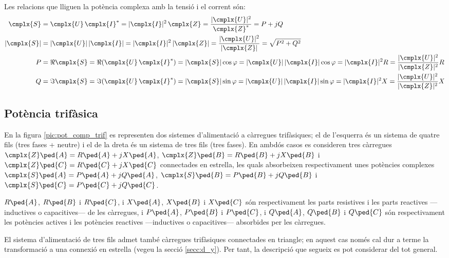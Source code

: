 Les relacions que lliguen la potència complexa amb la tensió i el corrent són:
\begin{align}
   \cmplx{S} &=  \cmplx{U} \,\cmplx{I}^* =
   |\cmplx{I}|^2 \,\cmplx{Z} = \frac{|\cmplx{U}|^2}{\cmplx{Z}^*} =
   P + j Q \label{eq:s_mono1}\\
   |\cmplx{S}| &= |\cmplx{U}| \,|\cmplx{I}| =
   |\cmplx{I}|^2 \,|\cmplx{Z}| = \frac{|\cmplx{U}|^2}{|\cmplx{Z}|} =
   \sqrt{P^2+Q^2} \\
   P &= \Re\cmplx{S} = \Re (\cmplx{U} \, \cmplx{I}^*) = |\cmplx{S}| \cos\varphi =
   |\cmplx{U}|\, |\cmplx{I}| \cos\varphi = |\cmplx{I}|^2 R =
   \frac{|\cmplx{U}|^2}{|\cmplx{Z}|^2}R\\
   Q &= \Im\cmplx{S} = \Im (\cmplx{U} \, \cmplx{I}^*) = |\cmplx{S}| \sin\varphi =
   |\cmplx{U}| \,|\cmplx{I}|\sin\varphi  = |\cmplx{I}|^2 X =
   \frac{|\cmplx{U}|^2}{|\cmplx{Z}|^2}X
\end{align}

\subsection{Potència trifàsica}  \label{sec:pot-trif}

En la figura \vref{pic:pot_comp_trif} es representen dos sistemes
d'alimentació a càrregues trifàsiques; el de l'esquerra és un
sistema de quatre fils (tres fases + neutre) i el de la dreta és un sistema
de tres fils (tres fases). En ambdós casos es consideren tres càrregues
$\cmplx{Z}\ped{A} = R\ped{A} + j X\ped{A}$, $\cmplx{Z}\ped{B}=
R\ped{B} + j X\ped{B}$ i $\cmplx{Z}\ped{C}= R\ped{C} + j X\ped{C}$
connectades en estrella, les quals absorbeixen respectivament unes
potències complexes $\cmplx{S}\ped{A} = P\ped{A} + j Q\ped{A}$,
$\cmplx{S}\ped{B}= P\ped{B} + j Q\ped{B}$ i $\cmplx{S}\ped{C}=
P\ped{C} + j Q\ped{C}$.

$R\ped{A}$, $R\ped{B}$ i $R\ped{C}$, i $X\ped{A}$, $X\ped{B}$ i
$X\ped{C}$ són respectivament les parts resistives i les parts
reactives ---inductives o capacitives--- de les càrregues, i $P\ped{A}$,
$P\ped{B}$ i $P\ped{C}$, i $Q\ped{A}$, $Q\ped{B}$ i $Q\ped{C}$ són
respectivament les potències actives i les potències reactives
---inductives o capacitives--- absorbides per les càrregues.

El sistema d'alimentació de tres fils admet també càrregues
trifàsiques connectades en triangle; en aquest cas només cal dur a
terme la transformació a una connexió en estrella (vegeu la secció
\ref{secc:d_y}). Per tant, la descripció que segueix es pot
considerar del tot general.

